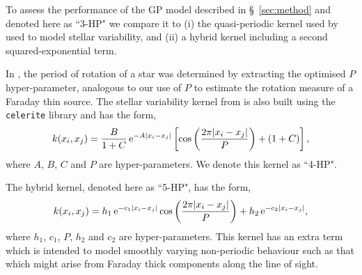 \documentclass[fleqn,usenatbib]{mnras}
\begin{document}
To assess the performance of the GP model described in \S~\ref{sec:method} and denoted here as ``3-HP" we compare it to (i) the quasi-periodic kernel used by \cite{celerite} used to model stellar variability, and (ii) a hybrid kernel including a second squared-exponential term. 

In \cite{celerite}, the period of rotation of a star was determined by extracting the optimised $P$ hyper-parameter, analogous to our use of $P$ to estimate the rotation measure of a Faraday thin source. The stellar variability kernel from \cite{celerite} is also built using the {\tt celerite} library and has the form,
%
\begin{equation}
\label{eq:fmkernel}
k(x_i,x_j)=\frac{B}{1+C}\,{\rm e}^{-A|x_i - x_j|}\left[\cos\left(\frac{2\pi|x_i - x_j|}{P}\right) + (1+C)\right],
\end{equation}
%
where $A$, $B$, $C$ and $P$ are hyper-parameters. We denote this kernel as ``4-HP".

The hybrid kernel, denoted here as ``5-HP", has the form,
%
\begin{equation}
\label{eq:celkernel}
k(x_i,x_j)=h_1\,{\rm e}^{-c_1|x_i - x_j|}\cos\left(\frac{2\pi|x_i - x_j|}{P}\right) + h_2\,{\rm e}^{-c_2|x_i - x_j|},
\end{equation}
%
where $h_1$, $c_1$, $P$, $h_2$ and $c_2$ are hyper-parameters. This kernel has an extra term which is intended to model smoothly varying non-periodic behaviour such as that which might arise from Faraday thick components along the line of sight.
\end{document}
